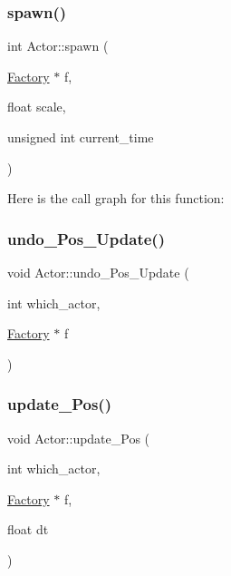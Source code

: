 \mbox{\label{namespace_actor_ab5468479b7705db60362fb26340d0c7b}} 
\subsubsection{\texorpdfstring{spawn()}{spawn()}}
{\footnotesize\ttfamily int Actor\+::spawn (\begin{DoxyParamCaption}\item[{\mbox{\hyperlink{struct_actor_1_1_factory}{Factory}} $\ast$}]{f,  }\item[{float}]{scale,  }\item[{unsigned int}]{current\+\_\+time }\end{DoxyParamCaption})}

Here is the call graph for this function\+:
\mbox{\label{namespace_actor_aa3ad0815b411b389fc1fef70ece978e9}} 
\subsubsection{\texorpdfstring{undo\+\_\+\+Pos\+\_\+\+Update()}{undo\_Pos\_Update()}}
{\footnotesize\ttfamily void Actor\+::undo\+\_\+\+Pos\+\_\+\+Update (\begin{DoxyParamCaption}\item[{int}]{which\+\_\+actor,  }\item[{\mbox{\hyperlink{struct_actor_1_1_factory}{Factory}} $\ast$}]{f }\end{DoxyParamCaption})}

\mbox{\label{namespace_actor_af6f7f45737ca4f6e33584d352d0e542c}} 
\subsubsection{\texorpdfstring{update\+\_\+\+Pos()}{update\_Pos()}}
{\footnotesize\ttfamily void Actor\+::update\+\_\+\+Pos (\begin{DoxyParamCaption}\item[{int}]{which\+\_\+actor,  }\item[{\mbox{\hyperlink{struct_actor_1_1_factory}{Factory}} $\ast$}]{f,  }\item[{float}]{dt }\end{DoxyParamCaption})}

